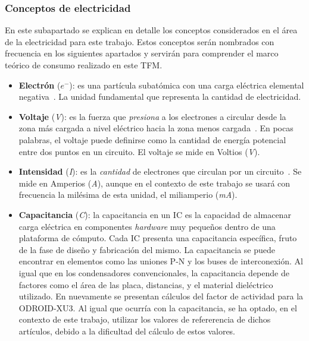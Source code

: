 \subsubsection{Conceptos de electricidad}
\label{subs:conceptos-electricidad}

En este subapartado se explican en detalle los conceptos considerados en el área de la electricidad para este trabajo. Estos conceptos serán nombrados con frecuencia en los siguientes apartados y servirán para comprender el marco teórico de consumo realizado en este \ac{TFM}.

\begin{itemize}

    \item \textbf{Electrón} ($e^-$): es una partícula subatómica con una carga eléctrica elemental negativa~\cite{electron}. La unidad fundamental que representa la cantidad de electricidad. 

    \item \textbf{Voltaje} (\emph{V}): es la fuerza que \emph{presiona} a los electrones a circular desde la zona más cargada a nivel eléctrico hacia la zona menos cargada~\cite{explicacionElectricidad}. En pocas palabras, el voltaje puede definirse como la cantidad de energía potencial entre dos puntos en un circuito. El voltaje se mide en Voltios (\emph{V}).

    \item \textbf{Intensidad} (\emph{I}): es la \emph{cantidad} de electrones que circulan por un circuito~\cite{explicacionElectricidad}. Se mide en Amperios (\emph{A}), aunque en el contexto de este trabajo se usará con frecuencia la milésima de esta unidad, el miliamperio (\emph{mA}).

    \item \textbf{Capacitancia} (\emph{C}): la capacitancia en un \ac{IC} es la capacidad de almacenar carga eléctrica en componentes \textit{hardware} muy pequeños dentro de una plataforma de cómputo. Cada \ac{IC} presenta una capacitancia específica, fruto de la fase de diseño y fabricación del mismo. La capacitancia se puede encontrar en elementos como las uniones P-N y los buses de interconexión. Al igual que en los condensadores convencionales, la capacitancia depende de factores como el área de las placa, distancias, y el material dieléctrico utilizado. En \cite{soton393728} \cite{soton418538} nuevamente se presentan cálculos del factor de actividad para la ODROID-XU3. Al igual que ocurría con la capacitancia, se ha optado, en el contexto de este trabajo, utilizar los valores de refererencia de dichos artículos, debido a la dificultad del cálculo de estos valores.


\end{itemize}
